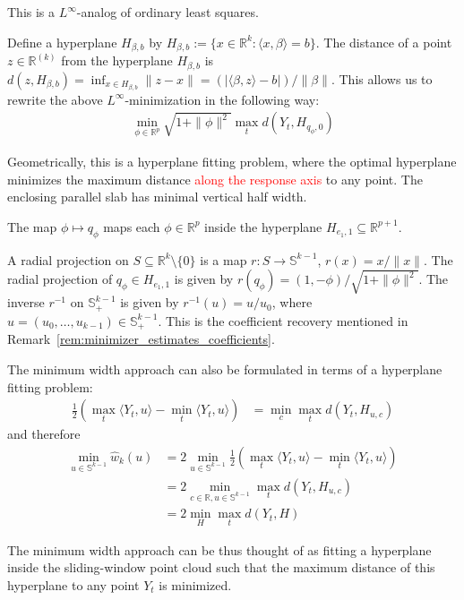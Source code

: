 This is a $L^{\infty}$-analog of ordinary least squares.

Define a hyperplane $H_{\beta,b}$ by $H_{\beta,b}:=\{x\in\mathbb{R}^{k}:\langle x,\beta\rangle=b\}$. The distance of a point $z\in\mathbb{R}^{(k)}$ from the hyperplane $H_{\beta,b}$ is $d(z,H_{\beta,b})=\inf_{x\in H_{\beta,b}}\|z-x\|=(|\langle\beta,z\rangle-b|)/\|\beta\|$. This allows us to rewrite the above $L^{\infty}$-minimization in the following way:
\begin{align*}
    \min_{\phi\in\mathbb{R}^{p}}\sqrt{1+\|\phi\|^2}\max_td(Y_t,H_{q_{\phi},0})
\end{align*}

Geometrically, this is a hyperplane fitting problem, where the optimal hyperplane minimizes the maximum distance \textcolor{red}{along the response axis} to any point. The enclosing parallel slab has minimal vertical half width.

The map $\phi\mapsto q_{\phi}$ maps each $\phi\in\mathbb{R}^{p}$ inside the hyperplane $H_{e_1,1}\subseteq\mathbb{R}^{p+1}$.

A radial projection on $S\subseteq\mathbb{R}^{k}\setminus\{0\}$ is a map $r:S\to\mathbb{S}^{k-1}$, $r(x)=x/\|x\|$. The radial projection of $q_{\phi}\in H_{e_1,1}$ is given by $r(q_{\phi})=(1,-\phi)/\sqrt{1+\|\phi\|^2}$. The inverse $r^{-1}$ on $\mathbb{S}^{k-1}_{+}$ is given by $r^{-1}(u)=u/u_0$, where $u=(u_0,\dots,u_{k-1})\in\mathbb{S}^{k-1}_{+}$. This is the coefficient recovery mentioned in Remark~\ref{rem:minimizer_estimates_coefficients}.

The minimum width approach can also be formulated in terms of a hyperplane fitting problem:
\begin{align*}
    \frac{1}{2}\left(\max_t\langle Y_t,u\rangle-\min_t\langle Y_t,u\rangle\right)&=\min_c\max_td(Y_t,H_{u,c})
\end{align*}
and therefore
\begin{align*}
    \min_{u\in\mathbb{S}^{k-1}}\hat{w}_k(u)&=2\min_{u\in\mathbb{S}^{k-1}}\frac{1}{2}\left(\max_t\langle Y_t,u\rangle-\min_t\langle Y_t,u\rangle\right)\\&
    =2\min_{c\in\mathbb{R},u\in\mathbb{S}^{k-1}}\max_td(Y_t,H_{u,c})\\&
    =2\min_{H}\max_t d(Y_t,H)
\end{align*}

The minimum width approach can be thus thought of as fitting a hyperplane inside the sliding-window point cloud such that the maximum distance of this hyperplane to any point $Y_t$ is minimized.


